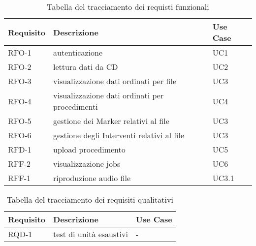 \newpage
\renewcommand{\arraystretch}{1.8} %
\begin{table}%
  \caption{Tabella del tracciamento dei requisti funzionali}
  \label{tab:requisiti-funzionali}
  \begin{tabularx}{\textwidth}{lXl}
    \hline
    \textbf{Requisito} & \textbf{Descrizione}                           & \textbf{Use Case} \\
    \hline
    RFO-1              & autenticazione                                 & UC1               \\
    \hline
    RFO-2              & lettura dati da CD                             & UC2               \\
    \hline
    RFO-3              & visualizzazione dati ordinati per file         & UC3               \\
    \hline
    RFO-4              & visualizzazione dati ordinati per procedimenti & UC4               \\
    \hline
    RFO-5              & gestione dei Marker relativi al file           & UC3               \\
    \hline
    RFO-6              & gestione degli Interventi relativi al file     & UC3               \\
    \hline
    RFD-1              & upload procedimento                            & UC5               \\
    \hline
    RFF-2              & visualizzazione jobs                           & UC6               \\
    \hline
    RFF-1              & riproduzione audio file                        & UC3.1             \\
    \hline
  \end{tabularx}
\end{table}%
\renewcommand{\arraystretch}{1.8} %
\begin{table}%
  \caption{Tabella del tracciamento dei requisiti qualitativi}
  \label{tab:requisiti-qualitativi}
  \begin{tabularx}{\textwidth}{lXl}
    \hline
    \textbf{Requisito} & \textbf{Descrizione}    & \textbf{Use Case} \\
    \hline
    RQD-1              & test di unità esaustivi & -                 \\
    \hline
  \end{tabularx}
\end{table}%